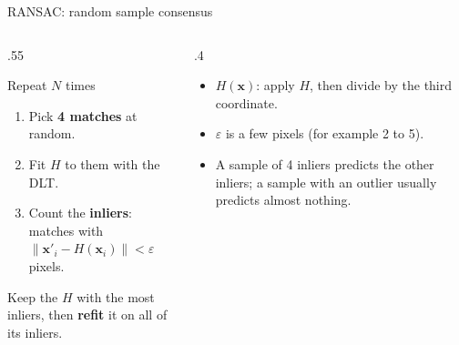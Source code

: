 \documentclass[aspectratio=169,11pt]{beamer}
\begin{document}
\begin{frame}{RANSAC: random sample consensus}
  \begin{columns}[T]
    \begin{column}{.55\textwidth}
      \begin{block}{Repeat $N$ times}
        \begin{enumerate}\setlength{\itemsep}{.35em}
          \item Pick \textbf{4 matches} at random.
          \item Fit $H$ to them with the DLT.
          \item Count the \textbf{inliers}: matches with $\lVert \mathbf{x}'_i - H(\mathbf{x}_i)\rVert < \varepsilon$ pixels.
        \end{enumerate}
      \end{block}
      \vspace{.3em}
      Keep the $H$ with the most inliers, then \textbf{refit} it on all of its inliers.
    \end{column}
    \begin{column}{.4\textwidth}
      \small
      \begin{itemize}\setlength{\itemsep}{.55em}
        \item $H(\mathbf{x})$: apply $H$, then divide by the third coordinate.
        \item $\varepsilon$ is a few pixels (for example 2 to 5).
        \item A sample of 4 inliers predicts the other inliers; a sample with an outlier usually predicts almost nothing.
      \end{itemize}
    \end{column}
  \end{columns}
\end{frame}
\end{document}
